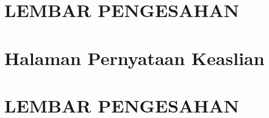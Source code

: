 \documentclass[10pt,]{report}
\begin{document}


\section{LEMBAR PENGESAHAN }
\pagebreak


\section{Halaman Pernyataan Keaslian }
\pagebreak
\section{LEMBAR PENGESAHAN }
\pagebreak
\end{document}
